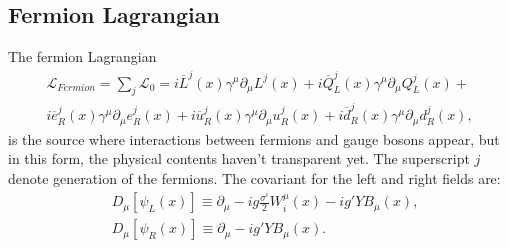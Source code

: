 \documentclass{report}
\numberwithin{equation}{section}
\begin{document}
\subsection{Fermion Lagrangian}
The fermion Lagrangian
\begin{equation}
\begin{split}
\mathcal{L}_{Fermion}=\sum_j \mathcal{L}_0 = i\overline{L}^j(x) \gamma^\mu \partial_\mu L^j(x)+i\overline{Q}_L^j(x) \gamma^\mu \partial_\mu Q_L^j(x)+\\
i\overline{e}_R^j(x) \gamma^\mu \partial_\mu e_R^j(x)+
i\overline{u}_R^j(x) \gamma^\mu \partial_\mu u_R^j(x)+
i\overline{d}_R^j(x) \gamma^\mu \partial_\mu d_R^j(x),
\end{split}
\end{equation}
is the source where interactions between fermions and gauge bosons appear, but in this form, the physical contents haven't transparent yet.
The superscript $j$ denote generation of the fermions. The covariant for the left and right fields are:
\begin{align}
&D_\mu[\psi_L(x)]\equiv \partial_\mu -ig\frac{\sigma^i}{2}W^\mu_i(x)- ig'YB_\mu(x),\\
&D_\mu[\psi_R(x)]\equiv \partial_\mu - ig'YB_\mu(x).\\
\end{align}
\end{document}
